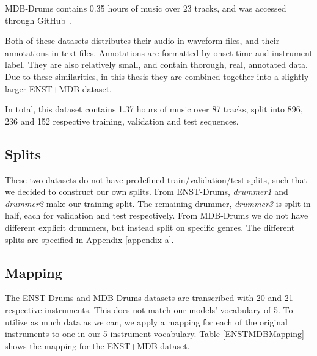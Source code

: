 MDB-Drums contains 0.35 hours of music over 23 tracks, and was accessed through GitHub~\cite{southall_mdbdrums_2017}.

Both of these datasets distributes their audio in waveform files, and their annotations in text files. Annotations are formatted by onset time and instrument label. They are also relatively small, and contain thorough, real, annotated data. Due to these similarities, in this thesis they are combined together into a slightly larger ENST+MDB dataset.

In total, this dataset contains 1.37 hours of music over 87 tracks, split into 896, 236 and 152 respective training, validation and test sequences.

\subsection{Splits}

These two datasets do not have predefined train/validation/test splits, such that we decided to construct our own splits. From ENST-Drums, \textit{drummer1} and \textit{drummer2} make our training split. The remaining drummer, \textit{drummer3} is split in half, each for validation and test respectively. From MDB-Drums we do not have different explicit drummers, but instead split on specific genres. The different splits are specified in Appendix \ref{appendix-a}.

\subsection{Mapping}

The ENST-Drums and MDB-Drums datasets are transcribed with 20 and 21 respective instruments. This does not match our models' vocabulary of 5. To utilize as much data as we can, we apply a mapping for each of the original instruments to one in our 5-instrument vocabulary. Table \ref{ENSTMDBMapping} shows the mapping for the ENST+MDB dataset.

